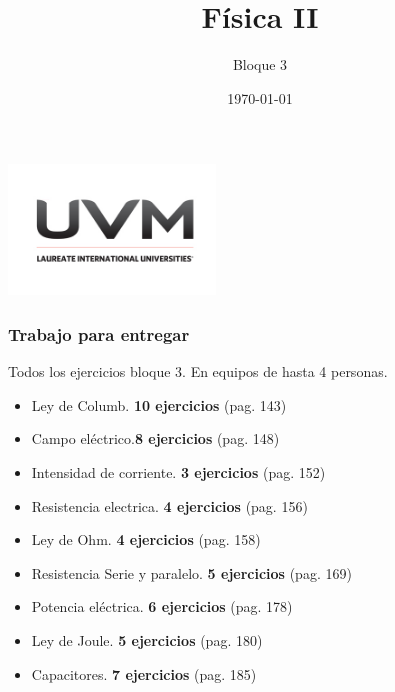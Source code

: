 \documentclass[handout]{beamer}
\title{Física II}
\author{Bloque 3}
\institute[UVM]{4\textdegree \hspace{2pt} cuatrimestre.}
\date{\today}
\begin{document}
\begin{frame}[noframenumbering]
  \titlepage
  \begin{center}
    \includegraphics[width=5.5cm]{uvm1}    
  \end{center}  
\end{frame}


\begin{frame}
  \frametitle{Trabajo para entregar}
  \begin{block}{}
    Todos los ejercicios bloque 3. En equipos de hasta 4 personas.
  \end{block}
  \begin{itemize}
  \item Ley de Columb. \textbf{10 ejercicios} (pag. 143)
  \item Campo eléctrico.\textbf{8 ejercicios} (pag. 148)
  \item Intensidad de corriente. \textbf{3 ejercicios} (pag. 152)
  \item Resistencia electrica. \textbf{4 ejercicios} (pag. 156)
  \item Ley de Ohm. \textbf{4 ejercicios} (pag. 158)
  \item Resistencia Serie y paralelo. \textbf{5 ejercicios} (pag. 169)
  \item Potencia eléctrica. \textbf{6 ejercicios} (pag. 178)
  \item Ley de Joule. \textbf{5 ejercicios} (pag. 180) 
  \item Capacitores. \textbf{7 ejercicios} (pag. 185) 
  \end{itemize}
\end{frame}




\end{document}

